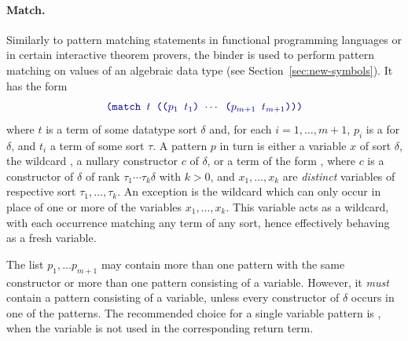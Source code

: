 \paragraph{Match.}
Similarly to pattern matching statements in functional programming languages
or in certain interactive theorem provers,
the  binder is used to perform pattern matching on values 
of an algebraic data type (see Section~\ref{sec:new-symbols}).
It has the form
%
\begin{equation} \label{eq:match}
\expr{(match $t$ (($p_1$ $t_1$) $\cdots$ ($p_{m+1}$ $t_{m+1}$)))}
\end{equation}
%
where $t$ is a term of some datatype sort $\delta$ and,
for each $i=1,\ldots,m+1$,
$p_i$ is a  for $\delta$, and $t_i$ a term of some sort $\tau$.
A pattern $p$ in turn is either a variable $x$ of sort $\delta$, 
the wildcard \ter{\_},
a nullary constructor $c$ of $\delta$, 
or a term of the form ,
where $c$ is a constructor of $\delta$ of rank
$\tau_1\cdots\tau_k\delta$ 
with $k > 0$, and $x_1, \ldots, x_k$ are \emph{distinct} variables 
of respective sort $\tau_1,\ldots,\tau_k$.
An exception is the wildcard \ter{\_} which can only occur 
in place of one or more of the variables $x_1, \ldots, x_k$.
This variable acts as a wildcard, with each occurrence matching any term
of any sort, hence effectively behaving as a fresh variable.

The list $p_1,\ldots p_{m+1}$ may contain more than one pattern with the same constructor 
or more than one pattern consisting of a variable.
However, it \emph{must} contain a pattern consisting of a variable,
unless every constructor of $\delta$ occurs in one of the patterns.
The recommended choice for a single variable pattern is \ter{\_}, when the variable is not used in the corresponding return term.




